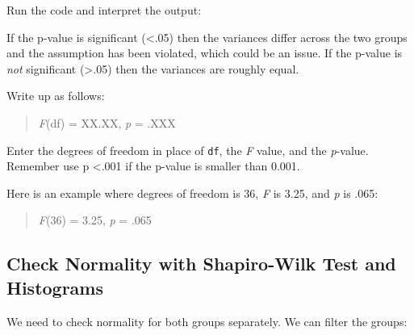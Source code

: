 \documentclass[
]{book}
\newenvironment{Shaded}{\begin{snugshade}}{\end{snugshade}}
\newcommand{\CommentTok}[1]{\textcolor[rgb]{0.56,0.35,0.01}{\textit{#1}}}
\newcommand{\FunctionTok}[1]{\textcolor[rgb]{0.13,0.29,0.53}{\textbf{#1}}}
\newcommand{\NormalTok}[1]{#1}
\newcommand{\OtherTok}[1]{\textcolor[rgb]{0.56,0.35,0.01}{#1}}
\newcommand{\SpecialCharTok}[1]{\textcolor[rgb]{0.81,0.36,0.00}{\textbf{#1}}}
\newcommand{\StringTok}[1]{\textcolor[rgb]{0.31,0.60,0.02}{#1}}
\let\oldsubsection\subsection
\renewcommand{\subsection}{\needspace{3\baselineskip}\oldsubsection}  %
\begin{document}
Run the code and interpret the output:

If the p-value is significant (\textless.05) then the variances differ across the two groups and the assumption has been violated, which could be an issue. If the p-value is \emph{not} significant (\textgreater.05) then the variances are roughly equal.

Write up as follows:

\begin{quote}
\emph{F}(df) = XX.XX, \emph{p} = .XXX
\end{quote}

Enter the degrees of freedom in place of \texttt{df}, the \emph{F} value, and the \emph{p}-value. Remember use p \textless.001 if the p-value is smaller than 0.001.

Here is an example where degrees of freedom is 36, \emph{F} is 3.25, and \emph{p} is .065:

\begin{quote}
\emph{F}(36) = 3.25, \emph{p} = .065
\end{quote}

\subsection{Check Normality with Shapiro-Wilk Test and Histograms}\label{check-normality-with-shapiro-wilk-test-and-histograms}

We need to check normality for both groups separately. We can filter the groups:

\begin{Shaded}
\end{Shaded}
\end{document}
